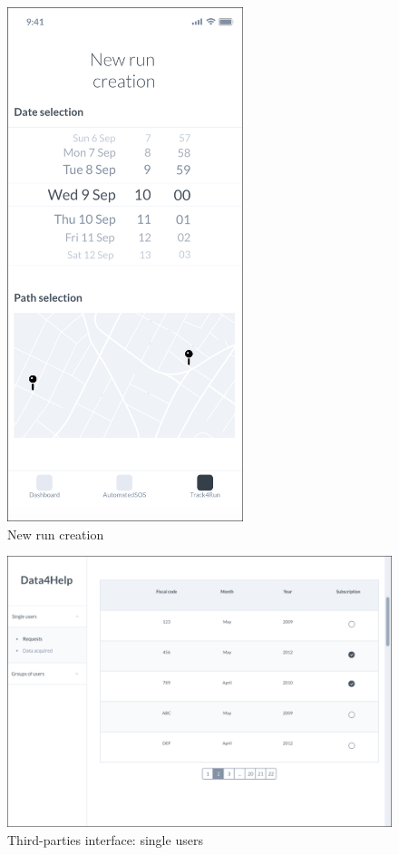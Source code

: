 \documentclass{article}
\begin{document}
	\begin{figure}[!h]
	 	\centering
		\includegraphics[height=15cm,keepaspectratio]{Figures/8Path}
		\caption{New run creation}
	\end{figure}\newpage	
	
	\begin{figure}[!h]
	 	\centering
		\includegraphics[width=\linewidth]{Figures/9Single}
		\caption{Third-parties interface: single users}
	\end{figure}\newpage
	
\end{document}
